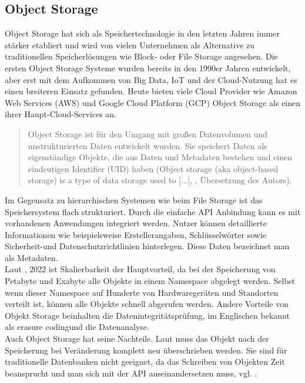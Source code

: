 \newpage

\subsection{Object Storage}

Object Storage hat sich als Speichertechnologie in den letzten Jahren immer stärker etabliert und wird von vielen Unternehmen als Alternative zu traditionellen Speicherlösungen wie Block- oder File Storage angesehen. Die ersten Object Storage Systeme wurden bereits in den 1990er Jahren entwickelt, aber erst mit dem Aufkommen von Big Data, IoT und der Cloud-Nutzung 
 hat es einen breiteren Einsatz gefunden. Heute bieten viele Cloud Provider wie Amazon Web Services (AWS) und Google Cloud Platform (GCP) Object Storage als einen ihrer Haupt-Cloud-Services an.
 
\begin{quote}
	Object Storage ist für den Umgang mit großen Datenvolumen und unstrukturierten Daten entwickelt wurden. Sie speichert Daten als eigenständige Objekte, die aus Daten und Metadaten bestehen und einen eindeutigen Identifier (UID) haben (\glqq Object storage (aka object-based storage) is a type of data storage used to [...]\grqq, \cite{dataCore-OS}, Übersetzung des Autors).
\end{quote}

Im Gegensatz zu hierarchischen Systemen wie beim File Storage ist das Speichersystem flach strukturiert. Durch die einfache API Anbindung kann es mit vorhandenen Anwendungen integriert werden. Nutzer können detaillierte Informationen wie beispielsweise Erstellerangaben, Schlüsselwörter sowie Sicherheit-und Datenschutzrichtlinien hinterlegen. Diese Daten bezeichnet man als Metadaten.\\

Laut \citeauthor{nx-fileScala}, 2022 ist Skalierbarkeit der Hauptvorteil, da bei der Speicherung von Petabyte und Exabyte alle Objekte in einem Namespace abgelegt werden. Selbst wenn dieser Namespace auf Hunderte von Hardwaregeräten und Standorten verteilt ist, können alle Objekte schnell abgerufen werden. Andere Vorteile von Objekt Storage beinhalten die Datenintegritätsprüfung, im Englischen bekannt als \glqq erasure coding\grqq und die Datenanalyse.\\

Auch Object Storage hat seine Nachteile. Laut \citeauthor{redHat-storage} muss das Objekt nach der Speicherung bei Veränderung komplett neu überschrieben werden. Sie sind für traditionelle Datenbanken nicht geeignet, da das Schreiben von Objekten Zeit beansprucht und man sich mit der API auseinandersetzen muss, vgl. \citeauthor{redHat-storage}.\\

